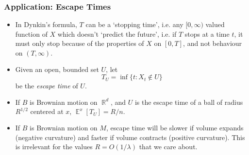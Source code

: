 \documentclass[usenames,dvipsnames,12pt]{beamer}
\DeclareMathOperator{\RR}{\mathbb{R}}
\DeclareMathOperator{\EE}{\mathbb{E}}
\begin{document}
\begin{frame}
    \frametitle{Application: Escape Times}

    \begin{itemize}
        \item In Dynkin's formula, $T$ can be a `stopping time', i.e. any $[0,\infty)$ valued function of $X$ which doesn't `predict the future', i.e. if $T$ stops at a time $t$, it must only stop because of the properties of $X$ on $[0,T]$, and not behaviour on $(T,\infty)$.

        \pause
        \item Given an open, bounded set $U$, let
        \[ T_U = \inf \{ t : X_t \not \in U \} \]
        be the \emph{escape time} of $U$.

        \pause
        \item If $B$ is Brownian motion on $\RR^d$, and $U$ is the escape time of a ball of radius $R^{1/2}$ centered at $x$, $\EE^x[T_U] = R / n$.

        \pause
        \item If $B$ is Brownian motion on $M$, escape time will be slower if volume expands (negative curvature) and faster if volume contracts (positive curvature). This is irrelevant for the values $R = O(1/\lambda)$ that we care about.
    \end{itemize}
\end{frame}
\end{document}
